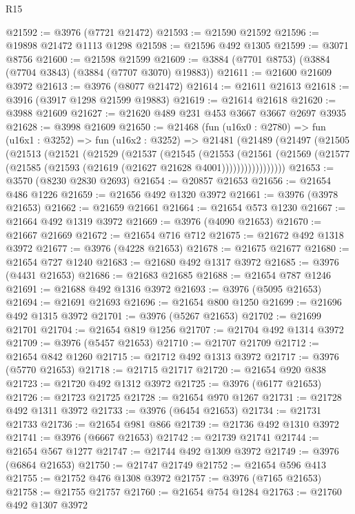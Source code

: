 \begin{lexlean}{R15}
\begin{coremodule}
@21592 := @3976 (@7721 @21472)
@21593 := @21590 @21592
@21596 := @19898 @21472 @1113 @1298
@21598 := @21596 @492 @1305
@21599 := @3071 @8756
@21600 := @21598 @21599
@21609 := @3884 (@7701 @8753) (@3884 (@7704 @3843) (@3884 (@7707 @3070) @19883))
@21611 := @21600 @21609 @3972
@21613 := @3976 (@8077 @21472)
@21614 := @21611 @21613
@21618 := @3916 (@3917 @1298 @21599 @19883)
@21619 := @21614 @21618
@21620 := @3988 @21609
@21627 := @21620 @489 @231 @453 @3667 @3667 @2697 @3935
@21628 := @3998 @21609
@21650 := @21468
    (fun (u16x0 : @2780) =>
    fun (u16x1 : @3252) =>
    fun (u16x2 : @3252) =>
    @21481
      (@21489
        (@21497
          (@21505
            (@21513
              (@21521
                (@21529
                  (@21537
                    (@21545
                      (@21553
                        (@21561
                          (@21569
                            (@21577 (@21585 (@21593 (@21619 (@21627 @21628 @4001)))))))))))))))))
@21653 := @3570 (@8230 @2830 @2693)
@21654 := @20857 @21653
@21656 := @21654 @486 @1226
@21659 := @21656 @492 @1320 @3972
@21661 := @3976 (@3978 @21653)
@21662 := @21659 @21661
@21664 := @21654 @573 @1230
@21667 := @21664 @492 @1319 @3972
@21669 := @3976 (@4090 @21653)
@21670 := @21667 @21669
@21672 := @21654 @716 @712
@21675 := @21672 @492 @1318 @3972
@21677 := @3976 (@4228 @21653)
@21678 := @21675 @21677
@21680 := @21654 @727 @1240
@21683 := @21680 @492 @1317 @3972
@21685 := @3976 (@4431 @21653)
@21686 := @21683 @21685
@21688 := @21654 @787 @1246
@21691 := @21688 @492 @1316 @3972
@21693 := @3976 (@5095 @21653)
@21694 := @21691 @21693
@21696 := @21654 @800 @1250
@21699 := @21696 @492 @1315 @3972
@21701 := @3976 (@5267 @21653)
@21702 := @21699 @21701
@21704 := @21654 @819 @1256
@21707 := @21704 @492 @1314 @3972
@21709 := @3976 (@5457 @21653)
@21710 := @21707 @21709
@21712 := @21654 @842 @1260
@21715 := @21712 @492 @1313 @3972
@21717 := @3976 (@5770 @21653)
@21718 := @21715 @21717
@21720 := @21654 @920 @838
@21723 := @21720 @492 @1312 @3972
@21725 := @3976 (@6177 @21653)
@21726 := @21723 @21725
@21728 := @21654 @970 @1267
@21731 := @21728 @492 @1311 @3972
@21733 := @3976 (@6454 @21653)
@21734 := @21731 @21733
@21736 := @21654 @981 @866
@21739 := @21736 @492 @1310 @3972
@21741 := @3976 (@6667 @21653)
@21742 := @21739 @21741
@21744 := @21654 @567 @1277
@21747 := @21744 @492 @1309 @3972
@21749 := @3976 (@6864 @21653)
@21750 := @21747 @21749
@21752 := @21654 @596 @413
@21755 := @21752 @476 @1308 @3972
@21757 := @3976 (@7165 @21653)
@21758 := @21755 @21757
@21760 := @21654 @754 @1284
@21763 := @21760 @492 @1307 @3972

\end{coremodule}
\end{lexlean}
